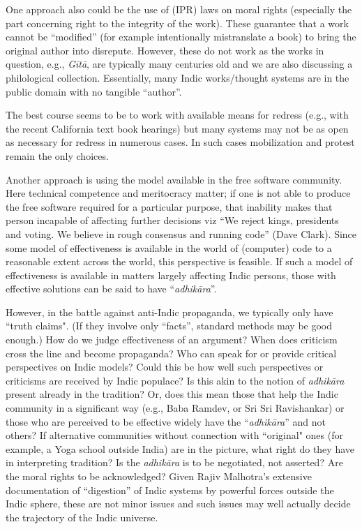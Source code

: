 One approach also could be the use of (IPR) laws on moral rights (especially the part concerning right to the integrity of the work). These guarantee that a work cannot be “modified” (for example intentionally mistranslate a book) to bring the original author into disrepute. However, these do not work as the works in question, e.g., {\sl Gītā}, are typically many centuries old and we are also discussing a philological collection. Essentially, many Indic works/thought systems are in the public domain with no tangible “author”.

The best course seems to be to work with available means for redress (e.g., with the recent California text book hearings) but many systems may not be as open as necessary for redress in numerous cases. In such cases mobilization and protest remain the only choices.

Another approach is using the model available in the free software community. Here technical competence and meritocracy matter; if one is not able to produce the free software required for a particular purpose, that inability makes that person incapable of affecting further decisions viz “We reject kings, presidents and voting. We believe in rough consensus and running code” (Dave Clark).  Since some model of effectiveness is available in the world of (computer) code to a reasonable extent across the world, this perspective is feasible. If such a model of effectiveness is available in matters largely affecting Indic persons, those with effective solutions can be said to have “{\sl adhikāra}”.

However, in the battle against anti-Indic propaganda, we typically only have ``truth claims". (If they involve only “facts”, standard methods may be good enough.) How do we judge effectiveness of an argument?  When does criticism cross the line and become propaganda? Who can speak for or provide critical perspectives on Indic models? Could this be how well such perspectives or criticisms are received by Indic populace? Is this akin to the notion of {\sl adhikāra} present already in the tradition? Or, does this mean those that help the Indic community in a significant way (e.g., Baba Ramdev, or Sri Sri Ravishankar) or those who are perceived to be effective widely have the “{\sl adhikāra}” and not others? If alternative communities without connection with ``original" ones (for example, a Yoga school outside India) are in the picture, what right do they have in interpreting tradition? Is the {\sl adhikāra} is to be negotiated, not asserted? Are the moral rights to be acknowledged? Given Rajiv Malhotra’s extensive documentation of “digestion” of Indic systems by powerful forces outside the Indic sphere, these are not minor issues and such issues may well actually decide the trajectory of the Indic universe.

